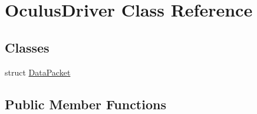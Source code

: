 \hypertarget{classOculusDriver}{}\section{Oculus\+Driver Class Reference}
\label{classOculusDriver}
\subsection*{Classes}
\begin{DoxyCompactItemize}
\item 
struct \hyperlink{structOculusDriver_1_1DataPacket}{Data\+Packet}
\end{DoxyCompactItemize}
\subsection*{Public Member Functions}
